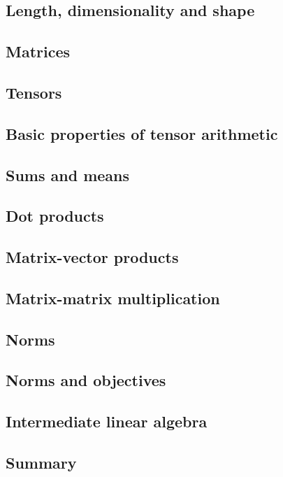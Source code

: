 \documentclass[]{article}
\begin{document}
\subsection{Length, dimensionality and shape}

\subsection{Matrices}

\subsection{Tensors}

\subsection{Basic properties of tensor arithmetic}

\subsection{Sums and means}

\subsection{Dot products}

\subsection{Matrix-vector products}

\subsection{Matrix-matrix multiplication}

\subsection{Norms}

\subsection{Norms and objectives}

\subsection{Intermediate linear algebra}

\subsection{Summary}
\end{document}

